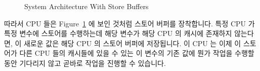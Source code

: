 \begin{figure}[tb]
\centering
{}
\caption{System Architecture With Store Buffers}
\label{fig:memorder:System Architecture With Store Buffers}
\end{figure}

따라서 CPU 들은
Figure~\ref{fig:memorder:System Architecture With Store Buffers} 에 보인 것처럼
스토어 버퍼를 장착합니다.
특정 CPU 가 특정 변수에 스토어를 수행하는데 해당 변수가 해당 CPU 의 캐시에
존재하지 않는다면, 이 새로운 값은 해당 CPU 의 스토어 버퍼에 저장됩니다.
이 CPU 는 이제 이 스토어가 다른 CPU 들의 캐시들에 있을 수 있는 이 변수의 기존
값에 뭔가 작업을 수행할동안 기다리지 않고 곧바로 작업을 진행할 수 있습니다.

